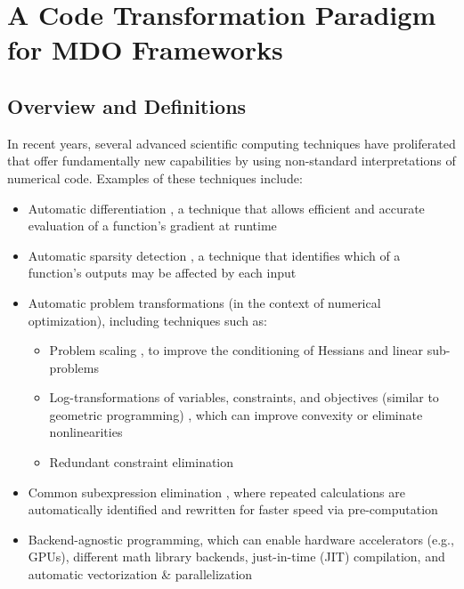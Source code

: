 \chapter{A Code Transformation Paradigm for MDO Frameworks}
\label{sec:code_transformations}

\section{Overview and Definitions}

In recent years, several advanced scientific computing techniques have proliferated that offer fundamentally new capabilities by using non-standard interpretations of numerical code. Examples of these techniques include:

\begin{itemize}[noitemsep]
    \item Automatic differentiation \cite{griewank_automatic_1988}, a technique that allows efficient and accurate evaluation of a function's gradient at runtime
    \item Automatic sparsity detection \cite{gebremedhin_efficient_2009}, a technique that identifies which of a function's outputs may be affected by each input
    \item Automatic problem transformations (in the context of numerical optimization), including techniques such as:
    \begin{itemize}[noitemsep]
        \item Problem scaling \cite{nocedal_numerical_2006}, to improve the conditioning of Hessians and linear sub-problems
        \item Log-transformations of variables, constraints, and objectives (similar to geometric programming) \cite{kirschen, agrawal_disciplined_2019}, which can improve convexity or eliminate nonlinearities
        \item Redundant constraint elimination
    \end{itemize}
    \item Common subexpression elimination \cite{casadi}, where repeated calculations are automatically identified and rewritten for faster speed via pre-computation
    \item Backend-agnostic programming, which can enable hardware accelerators (e.g., GPUs), different math library backends, just-in-time (JIT) compilation, and automatic vectorization \& parallelization \cite{jax}
\end{itemize}

